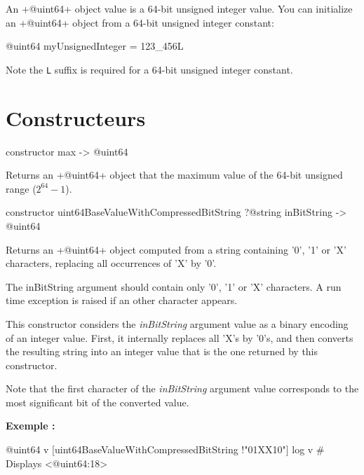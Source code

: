 

An \ggs+@uint64+ object value is a 64-bit unsigned integer value. You can initialize an \ggs+@uint64+ object from a 64-bit unsigned integer constant:

\begin{galgas}
@uint64 myUnsignedInteger = 123_456L
\end{galgas}

Note the \texttt{L} suffix is required for a 64-bit unsigned integer constant.

\section{Constructeurs}





\begin{galgas}
constructor max -> @uint64
\end{galgas}

Returns an \ggs+@uint64+ object that the maximum value of the 64-bit unsigned range ($2^{64}-1$).



\begin{galgas}
constructor uint64BaseValueWithCompressedBitString
   ?@string inBitString
   -> @uint64
\end{galgas}


Returns an \ggs+@uint64+ object computed from a string containing '0', '1' or 'X' characters, replacing all occurrences of 'X' by '0'.

The inBitString argument should contain only '0', '1' or 'X' characters. A run time exception is raised if an other character appears.

This constructor considers the \emph{inBitString} argument value as a binary encoding of an integer value. First, it internally replaces all 'X's by '0's, and then converts the resulting string into an integer value that is the one returned by this constructor.

Note that the first character of the \emph{inBitString} argument value corresponds to the most significant bit of the converted value.


\textbf{Exemple :}
\begin{galgas}
@uint64 v [uint64BaseValueWithCompressedBitString !"01XX10"]
log v # Displays <@uint64:18>
\end{galgas}





